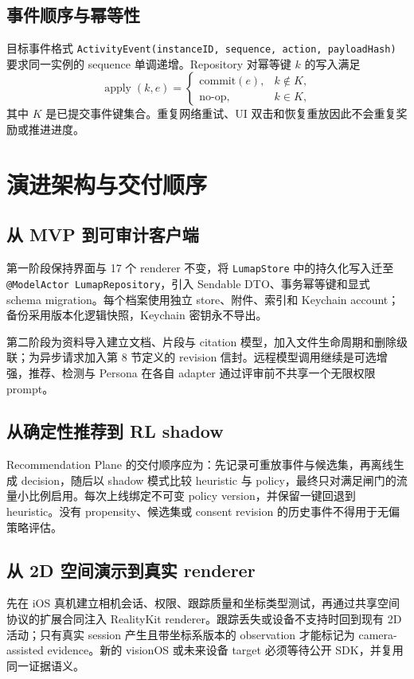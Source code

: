 \documentclass[11pt,a4paper,fontset=none]{ctexart}
\newcommand{\code}[1]{\begingroup\urlstyle{tt}\nolinkurl{#1}\endgroup}
\begin{document}
\subsection{事件顺序与幂等性}
目标事件格式 \code{ActivityEvent(instanceID, sequence, action, payloadHash)} 要求同一实例的 sequence 单调递增。Repository 对幂等键 $k$ 的写入满足
\begin{equation}
  \operatorname{apply}(k,e)=
  \begin{cases}
    \text{commit}(e), & k\notin K,\\
    \text{no-op}, & k\in K,
  \end{cases}
\end{equation}
其中 $K$ 是已提交事件键集合。重复网络重试、UI 双击和恢复重放因此不会重复奖励或推进进度。

\section{演进架构与交付顺序}
\label{sec:evolution}

\subsection{从 MVP 到可审计客户端}
第一阶段保持界面与 17 个 renderer 不变，将 \code{LumapStore} 中的持久化写入迁至 \code{@ModelActor LumapRepository}，引入 Sendable DTO、事务幂等键和显式 schema migration。每个档案使用独立 store、附件、索引和 Keychain account；备份采用版本化逻辑快照，Keychain 密钥永不导出。

第二阶段为资料导入建立文档、片段与 citation 模型，加入文件生命周期和删除级联；为异步请求加入第 8 节定义的 revision 信封。远程模型调用继续是可选增强，推荐、检测与 Persona 在各自 adapter 通过评审前不共享一个无限权限 prompt。

\subsection{从确定性推荐到 RL shadow}
Recommendation Plane 的交付顺序应为：先记录可重放事件与候选集，再离线生成 decision，随后以 shadow 模式比较 heuristic 与 policy，最终只对满足闸门的流量小比例启用。每次上线绑定不可变 policy version，并保留一键回退到 heuristic。没有 propensity、候选集或 consent revision 的历史事件不得用于无偏策略评估。

\subsection{从 2D 空间演示到真实 renderer}
先在 iOS 真机建立相机会话、权限、跟踪质量和坐标类型测试，再通过共享空间协议的扩展合同注入 RealityKit renderer。跟踪丢失或设备不支持时回到现有 2D 活动；只有真实 session 产生且带坐标系版本的 observation 才能标记为 camera-assisted evidence。新的 visionOS 或未来设备 target 必须等待公开 SDK，并复用同一证据语义。
\end{document}
